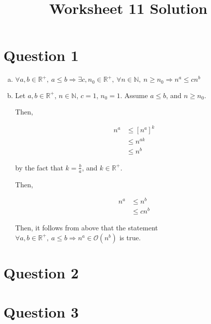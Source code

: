 \documentclass[12pt]{article}
\begin{document}
\title{Worksheet 11 Solution}
\maketitle

\section*{Question 1}
\begin{enumerate}[a.]
    \item

    $\forall a,b \in \mathbb{R}^{+},\: a \leq b \Rightarrow \exists c,n_0 \in \mathbb{R}^{+},
    \:\forall n \in \mathbb{N},\: n \geq n_0 \Rightarrow n^a \leq cn^b$

    \item


    Let $a,b \in \mathbb{R}^{+}$, $n \in \mathbb{N}$, $c = 1$, $n_0 = 1$.
    Assume $a \leq b$, and $n \geq n_0$.

    \bigskip

    Then,

    \begin{align}
        n^a &\leq \left[ n^a \right]^k\\
        &\leq n^{ak}\\
        &\leq n^b
    \end{align}

    by the fact that $k = \frac{b}{a}$, and $k \in \mathbb{R}^{+}$.

    \bigskip

    Then,

    \begin{align}
        n^a &\leq n^b\\
        &\leq cn^b
    \end{align}

    \bigskip

    Then, it follows from above that the statement $\forall a,b \in \mathbb{R}^{+},
    \:a \leq b \Rightarrow n^a \in \mathcal{O}(n^b)$ is true.


\end{enumerate}

\section*{Question 2}

\section*{Question 3}
\end{document}
